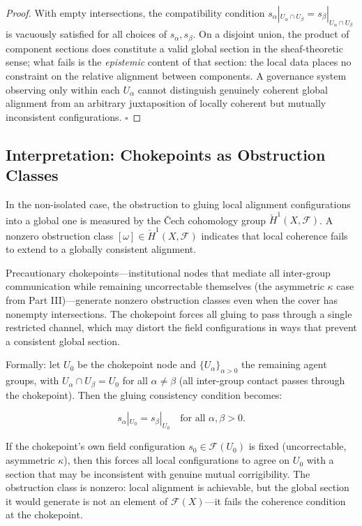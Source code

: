 \documentclass[11pt,a4paper]{article}
\theoremstyle{definition}
\theoremstyle{plain}
\begin{document}
\begin{mdframed}[style=appendixbox]
\begin{proof}
With empty intersections, the compatibility condition $s_\alpha|_{U_\alpha \cap U_\beta} = s_\beta|_{U_\alpha \cap U_\beta}$ is vacuously satisfied for all choices of $s_\alpha, s_\beta$. On a disjoint union, the product of component sections does constitute a valid global section in the sheaf-theoretic sense; what fails is the \emph{epistemic} content of that section: the local data places no constraint on the relative alignment between components. A governance system observing only within each $U_\alpha$ cannot distinguish genuinely coherent global alignment from an arbitrary juxtaposition of locally coherent but mutually inconsistent configurations. $\square$
\end{proof}

\subsection{Interpretation: Chokepoints as Obstruction Classes}

In the non-isolated case, the obstruction to gluing local alignment configurations into a global one is measured by the \v{C}ech cohomology group $\check{H}^1(X, \mathcal{F})$. A nonzero obstruction class $[\omega] \in \check{H}^1(X, \mathcal{F})$ indicates that local coherence fails to extend to a globally consistent alignment.

Precautionary chokepoints---institutional nodes that mediate all inter-group communication while remaining uncorrectable themselves (the asymmetric $\kappa$ case from Part III)---generate nonzero obstruction classes even when the cover has nonempty intersections. The chokepoint forces all gluing to pass through a single restricted channel, which may distort the field configurations in ways that prevent a consistent global section.

Formally: let $U_0$ be the chokepoint node and $\{U_\alpha\}_{\alpha > 0}$ the remaining agent groups, with $U_\alpha \cap U_\beta = U_0$ for all $\alpha \neq \beta$ (all inter-group contact passes through the chokepoint). Then the gluing consistency condition becomes:

\begin{equation}
s_\alpha|_{U_0} = s_\beta|_{U_0} \quad \text{for all } \alpha, \beta > 0.
\end{equation}

If the chokepoint's own field configuration $s_0 \in \mathcal{F}(U_0)$ is fixed (uncorrectable, asymmetric $\kappa$), then this forces all local configurations to agree on $U_0$ with a section that may be inconsistent with genuine mutual corrigibility. The obstruction class is nonzero: local alignment is achievable, but the global section it would generate is not an element of $\mathcal{F}(X)$---it fails the coherence condition at the chokepoint.


\end{mdframed}
\end{document}
